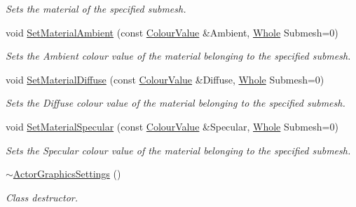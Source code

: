 \begin{DoxyCompactItemize}
\begin{DoxyCompactList}\small\item\em Sets the material of the specified submesh. \item\end{DoxyCompactList}\item 
void \hyperlink{classMezzanine_1_1ActorGraphicsSettings_a62f9dcc3c2af046b5f64a2ef886fc4ae}{SetMaterialAmbient} (const \hyperlink{classMezzanine_1_1ColourValue}{ColourValue} \&Ambient, \hyperlink{namespaceMezzanine_adcbb6ce6d1eb4379d109e51171e2e493}{Whole} Submesh=0)
\begin{DoxyCompactList}\small\item\em Sets the Ambient colour value of the material belonging to the specified submesh. \item\end{DoxyCompactList}\item 
void \hyperlink{classMezzanine_1_1ActorGraphicsSettings_a6b910a8c0f85df475baafc06dbd2d88a}{SetMaterialDiffuse} (const \hyperlink{classMezzanine_1_1ColourValue}{ColourValue} \&Diffuse, \hyperlink{namespaceMezzanine_adcbb6ce6d1eb4379d109e51171e2e493}{Whole} Submesh=0)
\begin{DoxyCompactList}\small\item\em Sets the Diffuse colour value of the material belonging to the specified submesh. \item\end{DoxyCompactList}\item 
void \hyperlink{classMezzanine_1_1ActorGraphicsSettings_a6d828b04f1b88b711ff1ae3339eeaa51}{SetMaterialSpecular} (const \hyperlink{classMezzanine_1_1ColourValue}{ColourValue} \&Specular, \hyperlink{namespaceMezzanine_adcbb6ce6d1eb4379d109e51171e2e493}{Whole} Submesh=0)
\begin{DoxyCompactList}\small\item\em Sets the Specular colour value of the material belonging to the specified submesh. \item\end{DoxyCompactList}\item 
\hypertarget{classMezzanine_1_1ActorGraphicsSettings_a31e3f53faedd5f8e9f863f472eb9e7f9}{
\hyperlink{classMezzanine_1_1ActorGraphicsSettings_a31e3f53faedd5f8e9f863f472eb9e7f9}{$\sim$ActorGraphicsSettings} ()}
\label{classMezzanine_1_1ActorGraphicsSettings_a31e3f53faedd5f8e9f863f472eb9e7f9}

\begin{DoxyCompactList}\small\item\em Class destructor. \item\end{DoxyCompactList}\end{DoxyCompactItemize}

